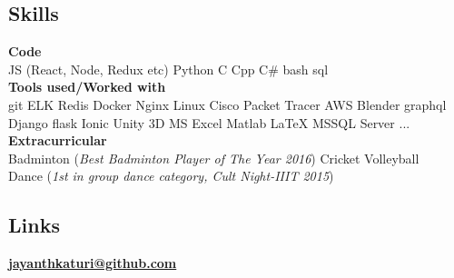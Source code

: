 \documentclass[letterpaper]{deedy-resume} %
\begin{document}

\lastupdated %



\begin{minipage}[t]{0.31\textwidth} %

\vspace{\topsep} %
\vspace{\topsep} %
\subsection{Skills}
\textbf{Code} \\
JS (React, Node, Redux etc) \textbullet{} Python \textbullet{} C \textbullet{} Cpp \textbullet{} C\# \textbullet{} bash \textbullet{} sql \\
\textbf{Tools used/Worked with} \\
git \textbullet{} ELK \textbullet{} Redis \textbullet{} Docker
\textbullet{} Nginx \textbullet{} Linux \textbullet{} Cisco Packet Tracer
\textbullet{} AWS \textbullet{} Blender \textbullet{} graphql
\textbullet{} Django \textbullet{} flask \textbullet{} Ionic \textbullet{} Unity 3D
\textbullet{} MS Excel \textbullet{} Matlab \textbullet{} \LaTeX \textbullet{} MSSQL Server \space ... \\
\textbf{Extracurricular} \\
\textbullet{} Badminton (\textit{Best Badminton Player of The Year 2016}) \textbullet{}
Cricket \textbullet{} Volleyball \\
\textbullet{} Dance (\textit{1st in group dance category, Cult Night-IIIT 2015}) \\
\sectionspace

\subsection{Links} 
\href{https://github.com/jayanthkaturi}{\bf jayanthkaturi@github.com} \\
\sectionspace %


\end{minipage}
\end{document}
